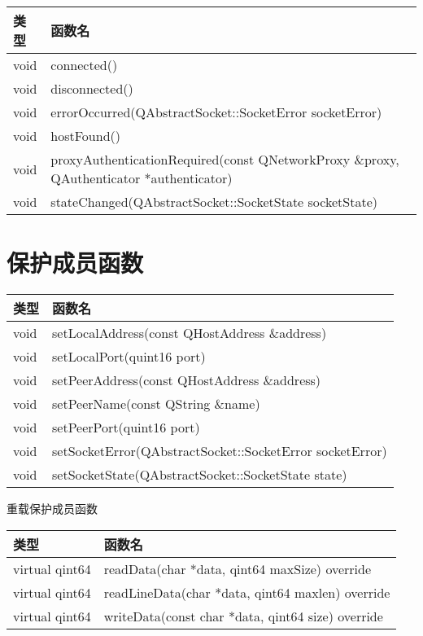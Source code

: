 \begin{tabular}{|m{5em}|m{35em}|}
\hline
类型&函数名 \\
\hline
void&	connected()\\
\hline
void&	disconnected()\\
\hline
void&	errorOccurred(QAbstractSocket::SocketError socketError)\\
\hline
void&	hostFound()\\
\hline
void&	proxyAuthenticationRequired(const QNetworkProxy \&proxy,
                                                          QAuthenticator
                                                          *authenticator)\\
\hline
void&	stateChanged(QAbstractSocket::SocketState socketState)\\
\hline
\end{tabular}

\section{保护成员函数}

\begin{tabular}{|m{5em}|m{35em}|}
\hline
类型&函数名 \\
\hline
void&	setLocalAddress(const QHostAddress \&address)\\
\hline
void&	setLocalPort(quint16 port)\\
\hline
void&	setPeerAddress(const QHostAddress \&address)\\
\hline
void&	setPeerName(const QString \&name)\\
\hline
void&	setPeerPort(quint16 port)\\
\hline
void&	setSocketError(QAbstractSocket::SocketError socketError)\\
\hline
void&	setSocketState(QAbstractSocket::SocketState state)\\
\hline
\end{tabular}

重载保护成员函数

\begin{tabular}{|m{5em}|m{35em}|}
\hline
类型&函数名 \\
\hline
virtual qint64&	readData(char *data, qint64 maxSize) override\\
\hline
virtual qint64&	readLineData(char *data, qint64 maxlen) override\\
\hline
virtual qint64&	writeData(const char *data, qint64 size) override\\
\hline
\end{tabular}


